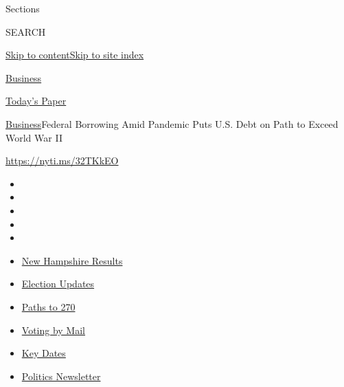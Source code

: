 Sections

SEARCH

\protect\hyperlink{site-content}{Skip to
content}\protect\hyperlink{site-index}{Skip to site index}

\href{https://www.nytimes3xbfgragh.onion/section/business}{Business}

\href{https://myaccount.nytimes3xbfgragh.onion/auth/login?response_type=cookie\&client_id=vi}{}

\href{https://www.nytimes3xbfgragh.onion/section/todayspaper}{Today's
Paper}

\href{/section/business}{Business}\textbar{}Federal Borrowing Amid
Pandemic Puts U.S. Debt on Path to Exceed World War II

\url{https://nyti.ms/32TKkEO}

\begin{itemize}
\item
\item
\item
\item
\item
\end{itemize}

\begin{itemize}
\item
  \href{https://www.nytimes3xbfgragh.onion/interactive/2020/09/08/us/elections/results-new-hampshire-primary-elections.html?action=click\&pgtype=Article\&state=default\&region=TOP_BANNER\&context=storylines_menu}{New
  Hampshire Results}
\item
  \href{https://www.nytimes3xbfgragh.onion/live/2020/09/08/us/trump-vs-biden?action=click\&pgtype=Article\&state=default\&region=TOP_BANNER\&context=storylines_menu}{Election
  Updates}
\item
  \href{https://www.nytimes3xbfgragh.onion/interactive/2020/us/elections/election-states-biden-trump.html?action=click\&pgtype=Article\&state=default\&region=TOP_BANNER\&context=storylines_menu}{Paths
  to 270}
\item
  \href{https://www.nytimes3xbfgragh.onion/interactive/2020/08/31/us/politics/vote-by-mail-deadlines.html?action=click\&pgtype=Article\&state=default\&region=TOP_BANNER\&context=storylines_menu}{Voting
  by Mail}
\item
  \href{https://www.nytimes3xbfgragh.onion/interactive/2019/us/elections/2020-presidential-election-calendar.html?action=click\&pgtype=Article\&state=default\&region=TOP_BANNER\&context=storylines_menu}{Key
  Dates}
\item
  \href{https://www.nytimes3xbfgragh.onion/newsletters/politics?action=click\&pgtype=Article\&state=default\&region=TOP_BANNER\&context=storylines_menu}{Politics
  Newsletter}
\end{itemize}

